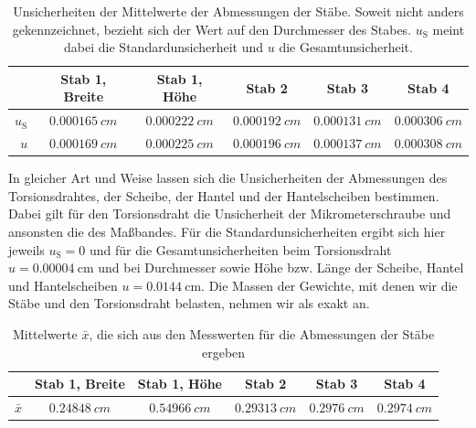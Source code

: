 \documentclass[
	a4paper,
	12pt,
	pagesize,
	ngerman
]{scrartcl}
\begin{document}
	\begin{table}[H]
		\centering
		\begin{tabular}{ r | c | c | c | c | c |} 
			& Stab 1, Breite & Stab 1, Höhe  & Stab 2 & Stab 3 &  Stab 4 \\ \hline
			$ u_\text{S} $  & $\SI{0,000165}{cm}$ &  $\SI{0,000222}{cm}$ &  $\SI{0,000192}{cm}$ &  $\SI{0,000131}{cm}$ & $\SI{0,000306}{cm}$  \\ \hline
			$ u $ & $\SI{0,000169}{cm}$ & $\SI{0,000225}{cm}$ & $\SI{0,000196}{cm}$ & $\SI{0,000137}{cm}$ & $\SI{0,000308}{cm}$ \\ \hline
		\end{tabular}
		\caption{Unsicherheiten der Mittelwerte der Abmessungen der Stäbe. Soweit nicht anders gekennzeichnet, bezieht sich der Wert auf den Durchmesser des Stabes. $ u_\text{S} $ meint dabei die Standardunsicherheit und $ u $ die Gesamtunsicherheit.}
		\label{Stäbe_Abmesungen_Unsicherheiten}
	\end{table}
	In gleicher Art und Weise lassen sich die Unsicherheiten der Abmessungen des Torsionsdrahtes, der Scheibe, der Hantel und der Hantelscheiben bestimmen. Dabei gilt für den Torsionsdraht die Unsicherheit der Mikrometerschraube und ansonsten die des Maßbandes. Für die Standardunsicherheiten ergibt sich hier jeweils $u_\text{S}=0 $ und für die Gesamtunsicherheiten beim Torsionsdraht $ u=  \SI{0,00004}{\centi \meter}$ und bei Durchmesser sowie Höhe bzw. Länge der Scheibe, Hantel und Hantelscheiben $ u= \SI{0,0144}{\centi \meter}$.
	Die Massen der Gewichte, mit denen wir die Stäbe und den Torsionsdraht belasten, nehmen wir als exakt an.





	\begin{table}[H]
		\centering
		\begin{tabular}{ r | c | c | c | c | c |} 
			& Stab 1, Breite & Stab 1, Höhe  & Stab 2 & Stab 3 &  Stab 4 \\ \hline
			$ \bar{x} $  & $\SI{0,24848}{cm}$ &  $\SI{0,54966}{cm}$ &  $\SI{0,29313}{cm}$ &  $\SI{0,2976}{cm}$ & $\SI{0,2974}{cm}$  \\ \hline
		\end{tabular}
		\caption{Mittelwerte $ \bar{x} $, die sich aus den Messwerten für die Abmessungen der Stäbe ergeben}
		\label{Abmessungen_Stäbe}
	\end{table}
	
\end{document}
